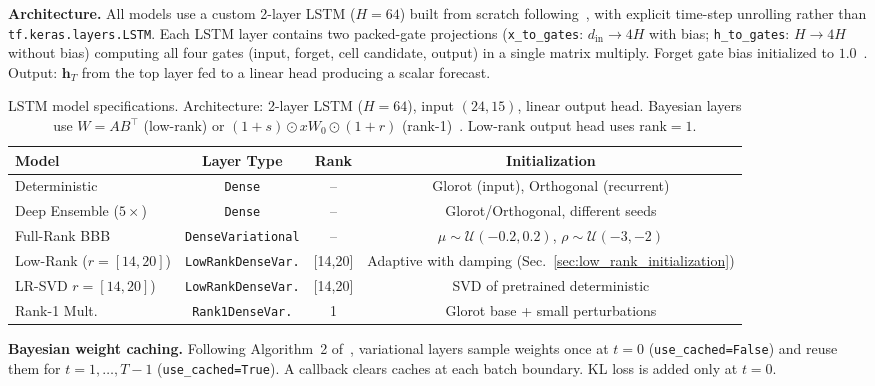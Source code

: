 \documentclass{article}
\theoremstyle{plain}
\theoremstyle{definition}
\theoremstyle{remark}
\begin{document}
\textbf{Architecture.} All models use a custom 2-layer LSTM ($H{=}64$) built from scratch following~\citet{fortunato2017bayesian}, with explicit time-step unrolling rather than \texttt{tf.keras.layers.LSTM}. Each LSTM layer contains two packed-gate projections (\texttt{x\_to\_gates}: $d_{\mathrm{in}} \to 4H$ with bias; \texttt{h\_to\_gates}: $H \to 4H$ without bias) computing all four gates (input, forget, cell candidate, output) in a single matrix multiply. Forget gate bias initialized to $1.0$~\cite{jozefowicz2015empirical}. Output: $\mathbf{h}_T$ from the top layer fed to a linear head producing a scalar forecast.

\begin{table}[h]
\small
\centering
\begin{tabular}{lccc}
\toprule
\textbf{Model} & \textbf{Layer Type} & \textbf{Rank} & \textbf{Initialization} \\
\midrule
Deterministic & \texttt{Dense} & -- & Glorot (input), Orthogonal (recurrent) \\
Deep Ensemble ($5\times$) & \texttt{Dense} & -- & Glorot/Orthogonal, different seeds \\
Full-Rank BBB & \texttt{DenseVariational} & -- & $\mu \sim \mathcal{U}(-0.2, 0.2)$, $\rho \sim \mathcal{U}(-3, -2)$ \\
Low-Rank ($r{=}[14,20]$) & \texttt{LowRankDenseVar.} & [14,20] & Adaptive with damping (Sec.~\ref{sec:low_rank_initialization}) \\
LR-SVD $r{=}[14,20]$) & \texttt{LowRankDenseVar.} & [14,20] & SVD of pretrained deterministic \\
Rank-1 Mult. & \texttt{Rank1DenseVar.} & 1 & Glorot base + small perturbations \\
\bottomrule
\end{tabular}
\caption{LSTM model specifications. Architecture: 2-layer LSTM ($H{=}64$), input $(24, 15)$, linear output head. Bayesian layers use $W = AB^\top$ (low-rank) or $(1{+}s) \odot xW_0 \odot (1{+}r)$ (rank-1)~\cite{dusenberry2020efficient}. Low-rank output head uses rank${}=1$.}
\label{tab:lstm_models}
\end{table}

\textbf{Bayesian weight caching.} Following Algorithm~2 of~\citet{fortunato2017bayesian}, variational layers sample weights once at $t{=}0$ (\texttt{use\_cached=False}) and reuse them for $t{=}1,\ldots,T{-}1$ (\texttt{use\_cached=True}). A callback clears caches at each batch boundary. KL loss is added only at $t{=}0$.
\end{document}
